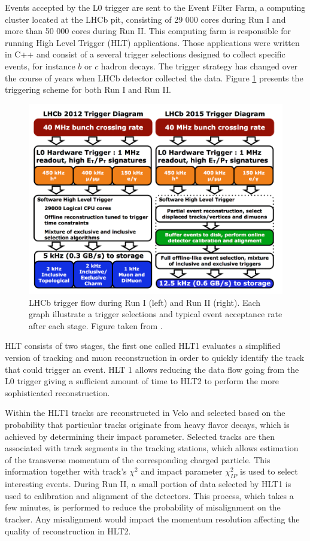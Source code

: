 Events accepted by the L0 trigger are sent to the Event Filter Farm, a computing cluster located at the LHCb pit, consisting of 29 000 cores during Run I and more than 50 000 cores during Run II.  This computing farm is responsible for running High Level Trigger (HLT) applications. Those applications were written in C++ and consist of a several trigger selections designed to collect specific events, for instance $b$ or $c$ hadron decays. The trigger strategy has changed over the course of years when LHCb detector collected the data. Figure \ref{fig:trigger} presents the triggering scheme for both Run I and Run II. 


\begin{figure}
\centering
\includegraphics[width=\linewidth]{figures/trigger.PNG}
\caption{LHCb trigger flow during Run I (left) and Run II (right). Each graph illustrate a trigger selections and typical event acceptance rate after each stage. Figure taken from \cite{trigger_schame}.
\label{fig:trigger}}
\end{figure}

HLT consists of two stages, the first one called HLT1 evaluates a simplified version of tracking and muon reconstruction in order to quickly identify the track that could trigger an event. HLT 1 allows reducing the data flow going from the L0 trigger giving a sufficient amount of time to HLT2 to perform the more sophisticated reconstruction.

Within the HLT1 tracks are reconstructed in Velo and selected based on the probability that particular tracks originate from heavy flavor decays, which is achieved by determining their impact parameter. Selected tracks are then associated with track segments in the tracking stations, which allows estimation of the transverse momentum of the corresponding charged particle. This information together with track’s $\chi^2$ and impact parameter $\chi^2_{IP}$ is used to select interesting events.  
During Run II, a small portion of data selected by HLT1 is used to calibration and alignment of the detectors. This process, which takes a few minutes, is performed to reduce the probability of misalignment on the tracker. Any misalignment would impact the momentum resolution affecting the quality of reconstruction in HLT2. 

